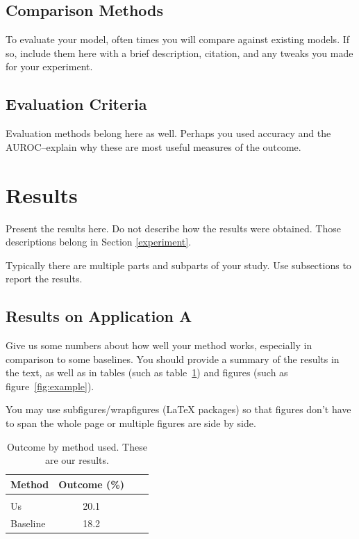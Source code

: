 \documentclass[twoside,11pt]{article}
\begin{document}
\subsection{Comparison Methods}
To evaluate your model, often times you will compare against existing models.
If so, include them here with a brief description, citation, and any tweaks you made for your experiment.

\subsection{Evaluation Criteria}
Evaluation methods belong here as well.
Perhaps you used accuracy and the AUROC--explain why these are most useful measures of the outcome.

\section{Results} \label{results}

Present the results here.
Do not describe how the results were obtained.
Those descriptions belong in Section \ref{experiment}.

Typically there are multiple parts and subparts of your study.
Use subsections to report the results.

\subsection{Results on Application A} 

Give us some numbers about how well your method works, especially in comparison to some baselines.
You should provide a summary of the results in the text, as well as in tables (such as table~\ref{tab:example}) and figures (such as figure~\ref{fig:example}).  

You may use subfigures/wrapfigures (LaTeX packages) so that figures don't have to span the whole page or multiple figures are side by side.

\begin{table}[htbp]
  \centering 
  \begin{tabular}{lclc} 
    Method & Outcome (\%) \\ 
    \hline \\[-11pt]
    Us & 20.1 \\ 
    Baseline & 18.2 \\ \hline 
  \end{tabular}
  \label{tab:example} 
    \caption{Outcome by method used. These are our results.} 
\end{table}
\end{document}
